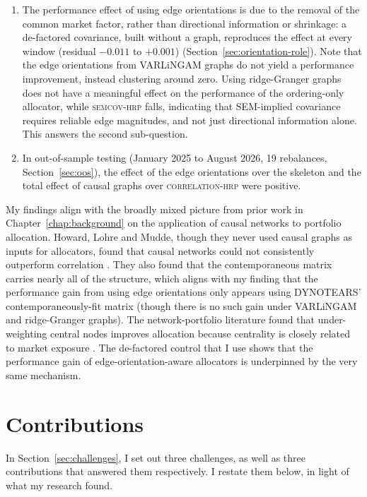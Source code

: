 \documentclass[11pt, a4paper]{report}
\newcommand{\corrhrp}{\textsc{correlation-hrp}}
\newcommand{\semcovhrp}{\textsc{semcov-hrp}}
\begin{document}
\begin{enumerate}[itemsep=2pt]
        sub-question.
  \item The performance effect of using edge orientations is due to the removal of the common market factor, rather than directional information or shrinkage: a de-factored covariance, built without a graph, reproduces the
        effect at every window (residual $-0.011$ to $+0.001$) (Section~\ref{sec:orientation-role}). 
        Note that the edge orientations from VARLiNGAM graphs do not yield a performance improvement, instead clustering around zero. Using ridge-Granger graphs does not have a meaningful effect on the performance of the ordering-only allocator, while \semcovhrp{} falls, indicating that SEM-implied covariance requires reliable edge magnitudes, and not just directional information alone. This answers the second
        sub-question.
  \item In out-of-sample testing (January 2025 to August 2026, 19 rebalances,
        Section~\ref{sec:oos}), the effect of the edge orientations over the skeleton and the total effect of causal graphs over \corrhrp{} were positive.
\end{enumerate}

My findings align with the broadly mixed picture from prior work in Chapter~\ref{chap:background} on the application of causal networks to portfolio allocation.
Howard, Lohre and Mudde, though they never used causal graphs as inputs for allocators, found that causal networks could not consistently outperform correlation \cite{howard2025causal}. They also found that the contemporaneous matrix carries nearly all of the structure, which aligns with my finding that the performance gain from using edge orientations only appears using DYNOTEARS' contemporaneously-fit matrix (though there is no such gain under VARLiNGAM and ridge-Granger graphs).
The network-portfolio literature found that under-weighting central nodes improves allocation because centrality is closely related to market exposure \cite{pozzi2013spread,peralta2016network}. The de-factored control that I use shows that the performance gain of edge-orientation-aware allocators is underpinned by the very same mechanism.

\section{Contributions}
\label{sec:contributions}

In Section~\ref{sec:challenges}, I set out three challenges, as well as three contributions that answered them respectively. I restate them below, in light of what my research found.
\end{document}
